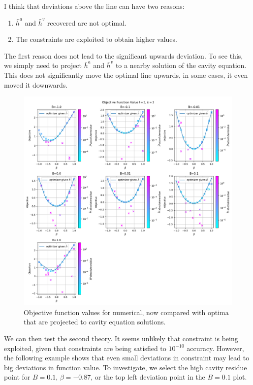 \documentclass[12pt]{article}
\numberwithin{equation}{section}
\begin{document}
I think that deviations above the line can have two reasons:
\begin{enumerate}
    \item $\bar{h}^a$ and $\bar{h}^v$ recovered are not optimal.
    \item The constraints are exploited to obtain higher values.
\end{enumerate}

The first reason does not lead to the significant upwards deviation. To see this, we simply need to project $\bar{h}^a$ and $\bar{h}^v$
to a nearby solution of the cavity equation. This does not significantly move the optimal line upwards, in some cases, it even moved it
downwards.
\begin{figure}[!h]
    \centering
    \includegraphics[width=18cm]{img/Ising_bptt/OBJ_l=3_k=3_solve_h.png}
    \caption{Objective function values for numerical, now compared with optima that are projected to cavity equation solutions.}
    \label{Fig.ISBP-OBJ-l3k3-solveh}
\end{figure}

\newpage

We can then test the second theory. It seems unlikely that constraint is being exploited, given that constraints are
being satisfied to $10^{-10}$ accuracy. However, the following example shows that even small deviations in constraint
may lead to big deviations in function value. To investigate, we select the high cavity residue point for $B=0.1$,
$\beta=-0.87$, or the top left deviation point in the $B=0.1$ plot.
\end{document}
